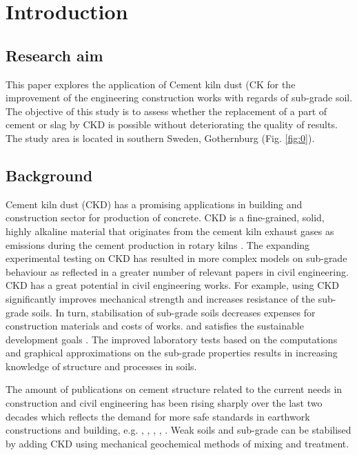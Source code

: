 \documentclass[a4paper,fleqn]{cas-dc}
\begin{document}
\section{Introduction}

\subsection{Research aim}
This paper explores the application of Cement kiln dust (CK for the improvement of the engineering construction works with regards of sub-grade soil. The objective of this study is to assess whether the replacement of a part of cement or slag by CKD is possible without deteriorating the quality of results. The study area is located in southern Sweden, Gothernburg (Fig. \ref{fig:0}).

\subsection{Background}
Cement kiln dust (CKD) has a promising applications in building and construction sector for production of concrete. CKD is a fine-grained, solid, highly alkaline material that originates from the cement kiln exhaust gases as emissions during the cement production in rotary kilns \citep{BARNATHUNEK2018149}. The expanding experimental testing on CKD has resulted in more complex models on sub-grade behaviour as reflected in a greater number of relevant papers in civil engineering. CKD has a great potential in civil engineering works. 
For example, using CKD significantly improves mechanical strength and increases resistance of the sub-grade soils. In turn, stabilisation of sub-grade soils decreases expenses for construction materials and costs of works. and satisfies the sustainable development goals \citep{ADEYANJU2020e00388}. The improved laboratory tests based on the computations and graphical approximations on the sub-grade properties results in increasing knowledge of structure and processes in soils. 

The amount of publications on cement structure related to the current needs in construction and civil engineering has been rising sharply over the last two decades which reflects the demand for more safe standards in earthwork constructions and building, e.g. \cite{SHOAIB2000371}, \cite{BERNAL2010898}, \cite{WANG2020103489}, \cite{ABDELGAWWAD20191218}, \cite{ABDELGAWWAD2021102479}. Weak soils and sub-grade can be stabilised by adding CKD using mechanical geochemical methods of mixing and treatment. 
\end{document}
